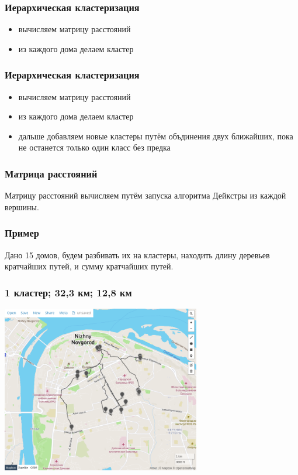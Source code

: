 \documentclass{beamer}
\begin{document}
\begin{frame}
	\frametitle{Иерархическая кластеризация}
	\begin{itemize}
		\item вычисляем матрицу расстояний
		\item из каждого дома делаем кластер
	\end{itemize}
\end{frame}

\begin{frame}
	\frametitle{Иерархическая кластеризация}
	\begin{itemize}
		\item вычисляем матрицу расстояний
		\item из каждого дома делаем кластер
		\item дальше добавляем новые кластеры путём объдинения двух ближайших, пока не останется только один класс без предка
	\end{itemize}
\end{frame}

\begin{frame}
	\frametitle{Матрица расстояний}
	Матрицу расстояний вычисляем путём запуска алгоритма Дейкстры из каждой вершины.
\end{frame}

\begin{frame}
	\frametitle{Пример}
	Дано 15 домов, будем разбивать их на кластеры, находить длину деревьев кратчайших путей, и сумму кратчайших путей.

\end{frame}

\begin{frame}
	\frametitle{1 кластер; 32,3 км; 12,8 км}
	\centering
	\includegraphics[width=0.65\textwidth]{k1}
\end{frame}
\end{document}
